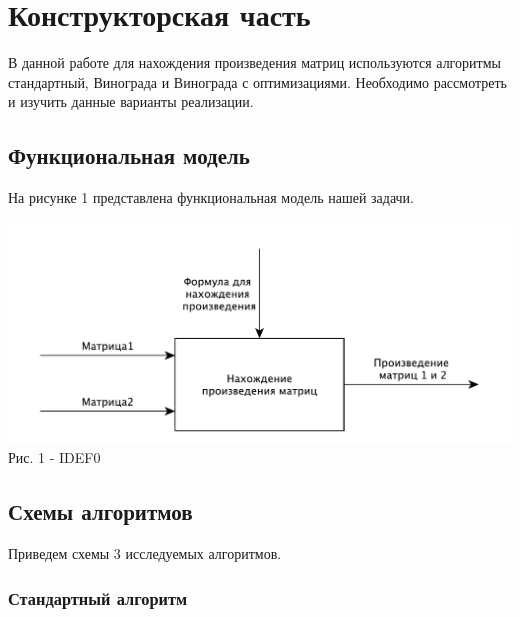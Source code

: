 \documentclass[a4paper,14pt]{article} %
\begin{document}
	\newpage

	\section{Конструкторская часть}
	\hfill
	
	 В данной работе для нахождения произведения матриц используются алгоритмы стандартный, Винограда и Винограда с оптимизациями. Необходимо рассмотреть и изучить данные варианты реализации. 
	
	\subsection{Функциональная модель}
	На рисунке 1 представлена функциональная модель нашей задачи.  
	\begin{center}
		\includegraphics[scale = 0.8]{idef0} \\ Рис.  1 - IDEF0
	\end{center}
	
        
        \subsection{Схемы алгоритмов}
        \hfill
        
        Приведем схемы 3 исследуемых алгоритмов. 
        
        \subsubsection{Стандартный алгоритм}
        
\end{document}
